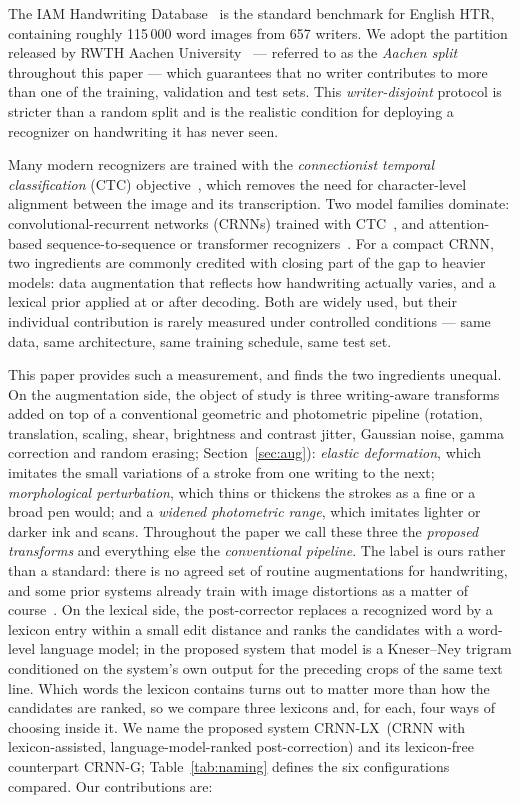 \documentclass{ws-ijprai}
\newcommand{\ours}{CRNN-LX}            %
\newcommand{\oursnolm}{CRNN-G}         %
\begin{document}
The IAM Handwriting Database~\cite{marti2002iam} is the standard
benchmark for English HTR, containing roughly 115\,000 word images from
657 writers. We adopt the partition released by RWTH Aachen
University~\cite{aachen_split} --- referred to as the \emph{Aachen
split} throughout this paper --- which guarantees that no writer
contributes to more than one of the training, validation and test
sets. This \emph{writer-disjoint} protocol is stricter than a random
split and is the realistic condition for deploying a recognizer on
handwriting it has never seen.

Many modern recognizers are trained with the \emph{connectionist temporal
classification} (CTC) objective~\cite{graves2006connectionist}, which
removes the need for character-level alignment between the image and
its transcription. Two model families dominate: convolutional-recurrent
networks (CRNNs) trained with CTC~\cite{shi2017crnn, puigcerver2017,
bluche2017gated}, and attention-based sequence-to-sequence or
transformer recognizers~\cite{kang2018convolve, michael2019evaluating,
li2023trocr}.
For a compact CRNN, two ingredients are commonly credited with closing
part of the gap to heavier models: data augmentation that reflects how
handwriting actually varies, and a lexical prior applied at or after
decoding. Both are widely used, but their individual contribution is
rarely measured under controlled conditions --- same data, same
architecture, same training schedule, same test set.

This paper provides such a measurement, and finds the two ingredients
unequal. On the augmentation side, the object of study is three
writing-aware transforms added on top of a conventional geometric and
photometric pipeline (rotation, translation, scaling, shear, brightness
and contrast jitter, Gaussian noise, gamma correction and random erasing;
Section~\ref{sec:aug}): \emph{elastic deformation}, which imitates the
small variations of a stroke from one writing to the next;
\emph{morphological perturbation}, which thins or thickens the strokes
as a fine or a broad pen would; and a \emph{widened photometric range},
which imitates lighter or darker ink and scans. Throughout the paper we
call these three the \emph{proposed transforms} and everything else the
\emph{conventional pipeline}. The label is ours rather than a standard:
there is no agreed set of routine augmentations for handwriting, and some
prior systems already train with image distortions as a matter of
course~\cite{dutta2018improving, wigington2017data, puigcerver2017}. On the lexical side, the post-corrector
replaces a recognized word by a lexicon entry within a small edit
distance and ranks the candidates with a word-level language model; in
the proposed system that model is a Kneser--Ney trigram conditioned on
the system's own output for the preceding crops of the same text
line. Which words the lexicon contains turns out to matter more than
how the candidates are ranked, so we compare three lexicons and, for
each, four ways of choosing inside it. We
name the proposed system \ours\ (CRNN with lexicon-assisted,
language-model-ranked post-correction) and its lexicon-free
counterpart \oursnolm; Table~\ref{tab:naming} defines the six
configurations compared. Our contributions are:
\end{document}
